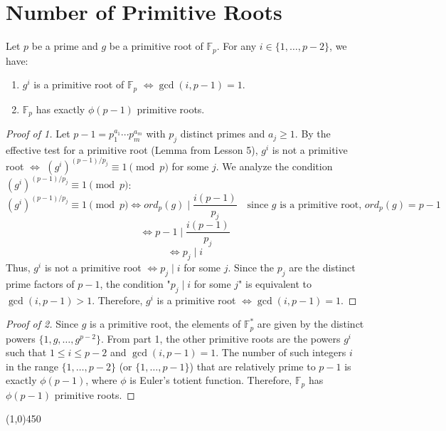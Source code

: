 \section{Number of Primitive Roots}

\begin{theorem}
    Let $p$ be a prime and $g$ be a primitive root of $\mathbb{F}_{p}$. For any $i \in \{1, \dots, p-2\}$, we have:
    \begin{enumerate}
        \item $g^{i}$ is a primitive root of $\mathbb{F}_{p}$ $\iff \gcd(i, p-1) = 1$.
        \item $\mathbb{F}_{p}$ has exactly $\phi(p-1)$ primitive roots.
    \end{enumerate}
\end{theorem}
\begin{proof}[Proof of 1]
    Let $p-1 = p_{1}^{a_{1}} \cdots p_{m}^{a_{m}}$ with $p_{j}$ distinct primes and $a_{j} \geq 1$.
    By the effective test for a primitive root (Lemma from Lesson 5), $g^{i}$ is not a primitive root $\iff$ $(g^{i})^{(p-1)/p_{j}} \equiv 1 \pmod{p}$ for some $j$.
    We analyze the condition $(g^{i})^{(p-1)/p_{j}} \equiv 1 \pmod{p}$:
    $$ (g^{i})^{(p-1)/p_{j}} \equiv 1 \pmod{p} \iff ord_{p}(g) \mid \frac{i(p-1)}{p_{j}} \quad \text{since } g \text{ is a primitive root, } ord_{p}(g) = p-1 $$
    $$ \iff p-1 \mid \frac{i(p-1)}{p_{j}} $$
    $$ \iff p_{j} \mid i $$
    Thus, $g^{i}$ is not a primitive root $\iff p_{j} \mid i$ for some $j$.
    Since the $p_{j}$ are the distinct prime factors of $p-1$, the condition "$p_{j} \mid i$ for some $j$" is equivalent to $\gcd(i, p-1) > 1$.
    Therefore, $g^{i}$ is a primitive root $\iff \gcd(i, p-1) = 1$.
\end{proof}
\begin{proof}[Proof of 2]
    Since $g$ is a primitive root, the elements of $\mathbb{F}_{p}^{*}$ are given by the distinct powers $\{1, g, \dots, g^{p-2}\}$.
    From part 1, the other primitive roots are the powers $g^{i}$ such that $1 \leq i \leq p-2$ and $\gcd(i, p-1) = 1$.
    The number of such integers $i$ in the range $\{1, \dots, p-2\}$ (or $\{1, \dots, p-1\}$) that are relatively prime to $p-1$ is exactly $\phi(p-1)$, where $\phi$ is Euler's totient function.
    Therefore, $\mathbb{F}_{p}$ has $\phi(p-1)$ primitive roots.
\end{proof}

\begin{center}
    \vspace{10pt}
    \line(1,0){450}
    \vspace{25pt}
\end{center}

